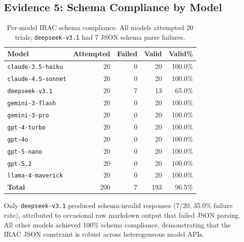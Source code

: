 \documentclass[11pt]{article}
\begin{document}
\subsection{Evidence 5: Schema Compliance by Model}
\begin{table}[ht]
\centering
\caption{Per-model IRAC schema compliance. All models attempted 20 trials; \texttt{deepseek-v3.1} had 7 JSON schema parse failures.}
\label{tab:schema_compliance}
\begin{tabular}{lrrrr}
\toprule
Model & Attempted & Failed & Valid & Valid\% \\
\midrule
\texttt{claude-3.5-haiku}   & 20 & 0 & 20 & 100.0\% \\
\texttt{claude-4.5-sonnet}  & 20 & 0 & 20 & 100.0\% \\
\texttt{deepseek-v3.1}      & 20 & 7 & 13 &  65.0\% \\
\texttt{gemini-3-flash}     & 20 & 0 & 20 & 100.0\% \\
\texttt{gemini-3-pro}       & 20 & 0 & 20 & 100.0\% \\
\texttt{gpt-4-turbo}        & 20 & 0 & 20 & 100.0\% \\
\texttt{gpt-4o}             & 20 & 0 & 20 & 100.0\% \\
\texttt{gpt-5-nano}         & 20 & 0 & 20 & 100.0\% \\
\texttt{gpt-5.2}            & 20 & 0 & 20 & 100.0\% \\
\texttt{llama-4-maverick}   & 20 & 0 & 20 & 100.0\% \\
\midrule
\textbf{Total}              & 200 & 7 & 193 & 96.5\% \\
\bottomrule
\end{tabular}
\end{table}

Only \texttt{deepseek-v3.1} produced schema-invalid responses (7/20, 35.0\% failure rate), attributed to occasional raw markdown output that failed JSON parsing. All other models achieved 100\% schema compliance, demonstrating that the IRAC JSON constraint is robust across heterogeneous model APIs.
\end{document}
